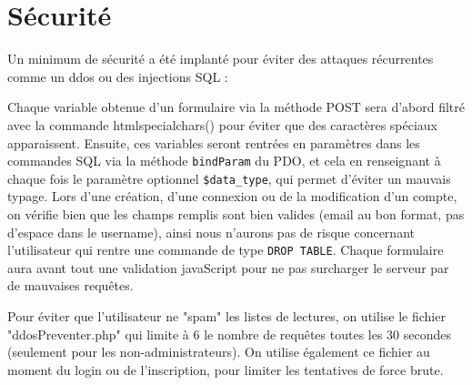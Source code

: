 \section{Sécurité}
    Un minimum de sécurité a été implanté pour éviter des attaques récurrentes comme un ddos ou des injections SQL :

Chaque variable obtenue d'un formulaire via la méthode POST sera d'abord filtré avec la commande htmlspecialchars() pour éviter que des caractères spéciaux apparaissent. Ensuite, ces variables seront rentrées en paramètres dans les commandes SQL via la méthode \texttt{bindParam} du PDO, et cela en renseignant à chaque fois le paramètre optionnel \texttt{\$data\_type}, qui permet d'éviter un mauvais typage.\newline
Lors d'une création, d'une connexion ou de la modification d'un compte, on vérifie bien que les champs remplis sont bien valides (email au bon format, pas d'espace dans le username), ainsi nous n'aurons pas de risque concernant l'utilisateur qui rentre une commande de type \texttt{DROP TABLE}.
Chaque formulaire aura avant tout une validation javaScript pour ne pas surcharger le serveur par de mauvaises requêtes.


Pour éviter que l'utilisateur ne "spam" les listes de lectures, on utilise le fichier "ddosPreventer.php" qui limite à 6 le nombre de requêtes toutes les 30 secondes (seulement pour les non-administrateurs).
On utilise également ce fichier au moment du login ou de l'inscription, pour limiter les tentatives de force brute.

